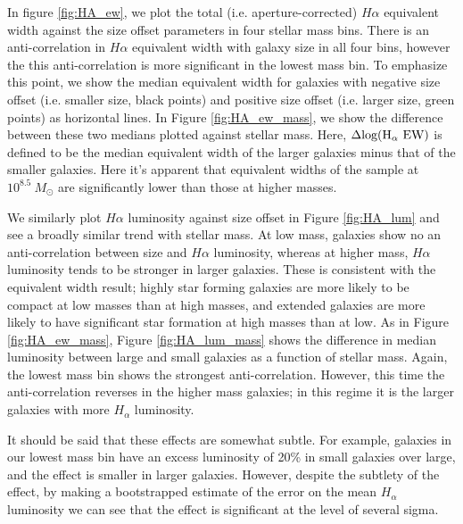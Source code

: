 \documentclass[iop]{emulateapj}
\begin{document}
In figure \ref{fig:HA_ew}, we plot the total (i.e. aperture-corrected) $H\alpha$ equivalent width against the size offset parameters in four stellar mass bins. There is an anti-correlation in $H \alpha$ equivalent width with galaxy size in all four bins, however the this anti-correlation is  more significant in the lowest mass bin. To emphasize this point, we show the median equivalent width for galaxies with negative size offset (i.e. smaller size, black points) and positive size offset (i.e. larger size, green points) as horizontal lines. In Figure \ref{fig:HA_ew_mass}, we show the difference between these two medians plotted against stellar mass. Here, $\rm \Delta log(H_{\alpha}\ EW)$ is defined to be the median equivalent width of the larger galaxies minus that of the smaller galaxies. Here it's apparent that equivalent widths of the sample at $10^{8.5} \ M_{\odot}$ are significantly lower than those at higher masses.

We similarly plot $H\alpha$ luminosity against size offset in Figure \ref{fig:HA_lum} and see a broadly similar trend with stellar mass. At low mass, galaxies show no an anti-correlation between size and $H\alpha$ luminosity, whereas at higher mass, $H\alpha$ luminosity tends to be stronger in larger galaxies. These is consistent with the equivalent width result; highly star forming galaxies are more likely to be compact at low masses than at high masses, and extended galaxies are more likely to have significant star formation at high masses than at low. As in Figure \ref{fig:HA_ew_mass}, Figure \ref{fig:HA_lum_mass} shows the difference in median luminosity between large and small galaxies as a function of stellar mass. Again, the lowest mass bin shows the strongest anti-correlation. However, this time the anti-correlation reverses in the higher mass galaxies; in this regime it is the larger galaxies with more $H_{\alpha}$ luminosity.

It should be said that these effects are somewhat subtle. For example, galaxies in our lowest mass bin have an excess luminosity of 20\% in small galaxies over large, and the effect is smaller in larger galaxies. However, despite the subtlety of the effect, by making a bootstrapped estimate of the error on the mean $H_{\alpha}$ luminosity we can see that the effect is significant at the level of several sigma.
\end{document}

